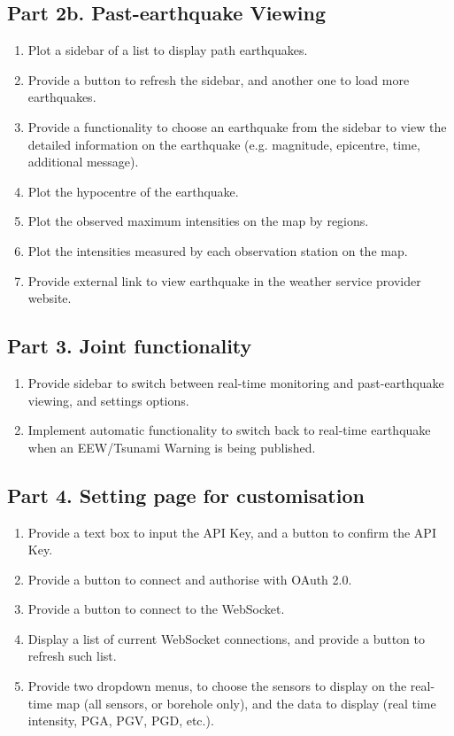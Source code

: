 \subsection{Part 2b. Past-earthquake Viewing}
\begin{enumerate}
    \item Plot a sidebar of a list to display path earthquakes.
    \item Provide a button to refresh the sidebar, and another one to load more earthquakes.
    \item Provide a functionality to choose an earthquake from the sidebar to view the detailed information on the earthquake (e.g. magnitude, epicentre, time, additional message).
    \item Plot the hypocentre of the earthquake.
    \item Plot the observed maximum intensities on the map by regions.
    \item Plot the intensities measured by each observation station on the map.
    \item Provide external link to view earthquake in the weather service provider website.
\end{enumerate}

\subsection{Part 3. Joint functionality}
\begin{enumerate}
    \item Provide sidebar to switch between real-time monitoring and past-earthquake viewing, and settings options.
    \item Implement automatic functionality to switch back to real-time earthquake when an EEW/Tsunami Warning is being published.
\end{enumerate}

\subsection{Part 4. Setting page for customisation}
\begin{enumerate}
    \item Provide a text box to input the API Key, and a button to confirm the API Key.
    \item Provide a button to connect and authorise with OAuth 2.0.
    \item Provide a button to connect to the WebSocket.
    \item Display a list of current WebSocket connections, and provide a button to refresh such list.
    \item Provide two dropdown menus, to choose the sensors to display on the real-time map (all sensors, or borehole only), and the data to display (real time intensity, PGA, PGV, PGD, etc.).
\end{enumerate}

